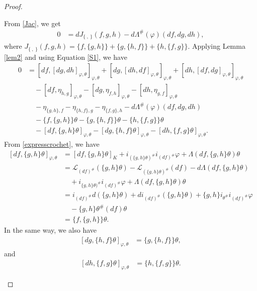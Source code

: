 \documentclass[10pt,a4paper]{amsart}
\begin{document}
\begin{proof}
\begin{itemize}
				From \eqref{Jac}, we get
				\begin{align}\label{S1}
					0 &=dJ_{\{\ ,\ \}}(f,g,h)-d\Lambda^{\#}(\varphi)(df,dg,dh),
				\end{align}
				where $J_{\{\ ,\ \}}(f,g,h)=\{f,\{g,h\}\}+\{g,\{h,f\}\}+\{h,\{f,g\}\}$.
				Applying Lemma \ref{lem2} and using Equation \eqref{S1}, we have
				\begin{align}\label{sr2}
					\nonumber
					0 &= [df,[dg,dh]_{\varphi,\theta}]_{\varphi,\theta}+[dg,[dh,df]_{\varphi,\theta}]_{\varphi,\theta}+[dh,[df,dg]_{\varphi,\theta}]_{\varphi,\theta}\\ \nonumber
					&\quad-[df,\eta_{h,g}]_{\varphi,\theta}-[dg,\eta_{f,h}]_{\varphi,\theta}-[dh,\eta_{g,f}]_{\varphi,\theta}\\ \nonumber
					&\quad-\eta_{\{g,h\},f}-\eta_{\{h,f\},g}-\eta_{\{f,g\},h}-d\Lambda^{\#}(\varphi)(df,dg,dh)\\ \nonumber
					&\quad-\{f,\{g,h\}\}\theta-\{g,\{h,f\}\}\theta-\{h,\{f,g\}\}\theta\\
					&\quad-[df,\{g,h\}\theta]_{\varphi,\theta}-[dg,\{h,f\}\theta]_{\varphi,\theta}-[dh,\{f,g\}\theta]_{\varphi,\theta}.
				\end{align}
				From \eqref{expresscrochet}, we have
				\begin{align}\label{sr1}
					\nonumber %
					[df,\{g,h\}\theta]_{\varphi,\theta} &=[df,\{g,h\}\theta]_K+i_{(\{g,h\}\theta)^{\#}}i_{(df)^{\#}}\varphi +\Lambda(df,\{g,h\}\theta)\theta\\ \nonumber
					&=\mathcal{L}_{(df)^{\#}}(\{g,h\}\theta)-\mathcal{L}_{(\{g,h\}\theta)^{\#}}(df)-d\Lambda(df,\{g,h\}\theta)\\ \nonumber
					&\quad+i_{\{g,h\}\theta)^{\#}}i_{(df)^{\#}}\varphi +\Lambda(df,\{g,h\}\theta)\theta\\ \nonumber
					&=i_{(df)^{\#}}d(\{g,h\}\theta)+ di_{(df)^{\#}}(\{g,h\}\theta)+\{g,h\}i_{\theta^{\#}}i_{(df)^{\#}}\varphi \\ \nonumber
					&\quad-\{g,h\}\theta^{\#}(df)\theta\\
					&=\{f,\{g,h\}\}\theta.
				\end{align}
				In the same way, we also have
				\begin{align}\label{sr10}
					[dg,\{h,f\}\theta]_{\varphi,\theta} &= \{g,\{h,f\}\}\theta,
				\end{align}
				and
				\begin{align} \label{sr11}
					[dh,\{f,g\}\theta]_{\varphi,\theta} &= \{h,\{f,g\}\}\theta.
				\end{align}
				

\end{itemize}
\end{proof}
\end{document}
